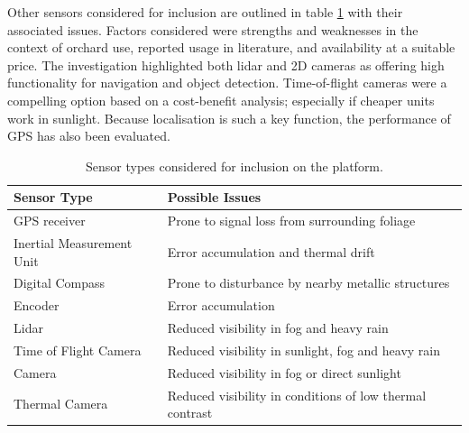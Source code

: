 \documentclass[preprint,authoryear,12pt]{elsarticle}
\begin{document}
    Other sensors considered for inclusion are outlined in table \ref{table:sensor_comparison} with their associated issues.
    Factors considered were strengths and weaknesses in the context of orchard use, reported usage in literature, and availability at a suitable price.
    The investigation highlighted both lidar and 2D cameras as offering high functionality for navigation and object detection.
    Time-of-flight cameras were a compelling option based on a cost-benefit analysis; especially if cheaper units work in sunlight.
    Because localisation is such a key function, the performance of GPS has also been evaluated.
    \begin{table}[htbp]
        \centering
        \footnotesize
        \begin{tabular}{ l l}

            \textbf{Sensor Type}      &\textbf{Possible Issues} \\ \hline
            GPS receiver              & Prone to signal loss from surrounding foliage\\  \hline
            Inertial Measurement Unit & Error accumulation and thermal drift\\ \hline
            Digital Compass           & Prone to disturbance by nearby metallic structures\\ \hline
            Encoder                   & Error accumulation \\ \hline
            Lidar                     & Reduced visibility in fog and heavy rain \\ \hline
            Time of Flight Camera     & Reduced visibility in sunlight, fog and heavy rain \\ \hline
            Camera                    & Reduced visibility in fog or direct sunlight \\ \hline
            Thermal Camera            & Reduced visibility in conditions of low thermal contrast\\ \hline
        \end{tabular}
        \caption{Sensor types considered for inclusion on the platform.}
        \label{table:sensor_comparison}
    \end{table}

\end{document}
